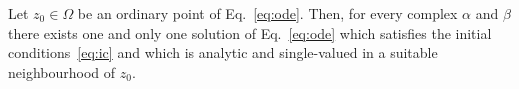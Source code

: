 

\begin{theorem}
   Let $z_{0}\in\Omega$ be an ordinary point 
   of Eq.~\eqref{eq:ode}.
   Then, for every complex $\alpha$ and $\beta$ there exists one and only one solution of Eq.~\eqref{eq:ode} 
   which satisfies 
   the initial conditions~\eqref{eq:ic} 
   and which is 
   analytic and single-valued  in a suitable neighbourhood of 
   $z_{0}$.
\end{theorem}

